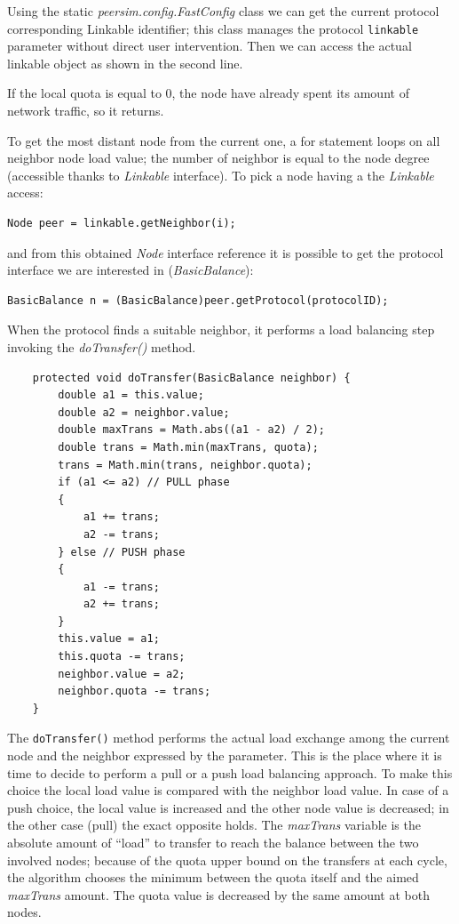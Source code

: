 \documentclass[a4paper,11pt]{article}
\begin{document}
Using the static \emph{peersim.config.FastConfig} class we can get the
current protocol corresponding Linkable identifier; this class manages
the protocol \texttt{linkable} parameter without direct user
intervention. Then we can access the actual linkable object as shown
in the second line.

If the local quota is equal to 0, the node have already
spent its amount of network traffic, so it returns.

To get the most distant node from the current one, a for statement loops on
all neighbor node load value; the number of neighbor is equal to the
node degree (accessible thanks to \emph{Linkable} interface). To pick
a node having a the \emph{Linkable} access:

\begin{verbatim}
Node peer = linkable.getNeighbor(i);
\end{verbatim}

and from this obtained \emph{Node} interface reference it is possible
to get the protocol interface we are interested in (\emph{BasicBalance}):

\begin{verbatim}
BasicBalance n = (BasicBalance)peer.getProtocol(protocolID);
\end{verbatim}

When the protocol finds a suitable neighbor, it performs a load balancing
step invoking the \emph{doTransfer()} method.

\footnotesize
\begin{verbatim}
    protected void doTransfer(BasicBalance neighbor) {
        double a1 = this.value;
        double a2 = neighbor.value;
        double maxTrans = Math.abs((a1 - a2) / 2);
        double trans = Math.min(maxTrans, quota);
        trans = Math.min(trans, neighbor.quota);
        if (a1 <= a2) // PULL phase
        {
            a1 += trans;
            a2 -= trans;
        } else // PUSH phase
        {
            a1 -= trans;
            a2 += trans;
        }
        this.value = a1;
        this.quota -= trans;
        neighbor.value = a2;
        neighbor.quota -= trans;
    }
\end{verbatim}
\normalsize


The \texttt{doTransfer()} method performs the actual load exchange
among the current node and the neighbor expressed by the parameter.
This is the place where it is time to decide to perform a pull or a
push load balancing approach. To make this choice the local load value
is compared with the neighbor load value. In case of a push choice,
the local value is increased and the other node value is decreased;
in the other case (pull) the exact opposite holds. The \emph{maxTrans}
variable is the absolute amount of ``{}load'' to transfer
to reach the balance between the two involved nodes; because of the
quota upper bound on the transfers at each cycle, the algorithm chooses
the minimum between the quota itself and the aimed \emph{maxTrans}
amount. The quota value is decreased by the same amount at both nodes.
\end{document}
